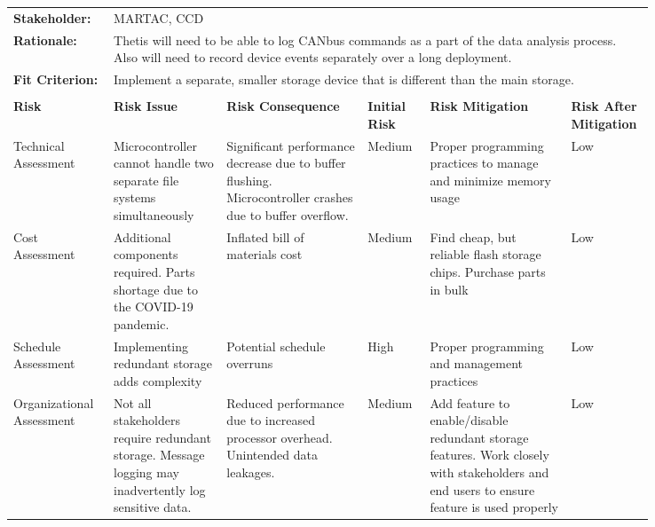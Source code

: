 \begin{landscape}
{\begin{longtable}{| p{0.12\linewidth} | p{0.16\linewidth} |  p{0.20\linewidth} | p{0.08\linewidth} | p{0.20\linewidth} | p{0.08\linewidth} |}
	\hline
	\rowcolor[gray]{0.8}
	\multicolumn{6}{|c|}{ } \\
	\hline
	\textbf{Stakeholder:} & \multicolumn{5}{|l|}{MARTAC, CCD} \\
	\hline
	\textbf{Rationale:} & \multicolumn{5}{|p{0.8\linewidth}|}{Thetis will need to be able to log CANbus commands as a part of the data analysis process. Also will need to record device events separately over a long deployment.} \\
	\hline
	\textbf{Fit Criterion:} & \multicolumn{5}{|p{0.8\linewidth}|}{Implement a separate, smaller storage device that is different than the main storage.} \\
	\hline
	\rowcolor[gray]{0.8}
	\multicolumn{6}{|c|}{ } \\
	\hline
	\textbf{Risk} & \textbf{Risk Issue} & \textbf{Risk Consequence} & \textbf{Initial Risk} & \textbf{Risk Mitigation} & \textbf{Risk \newline After \newline Mitigation} \\
	\hline
	Technical \newline Assessment & Microcontroller cannot handle two separate file systems simultaneously & Significant performance decrease due to buffer flushing. \newline Microcontroller crashes due to buffer overflow. & \cellcolor{yellow} Medium & Proper programming practices to manage and minimize memory usage & \cellcolor{green} Low \\
	\hline
	Cost \newline Assessment & Additional components required. \newline Parts shortage due to the COVID-19 pandemic. & Inflated bill of materials cost & \cellcolor{yellow} Medium & Find cheap, but reliable flash storage chips. \newline Purchase parts in bulk & \cellcolor{green} Low \\
	\hline
	Schedule \newline Assessment & Implementing redundant storage adds complexity & Potential schedule overruns & \cellcolor{red} High & Proper programming and management practices & \cellcolor{green} Low \\
	\hline
	Organizational \newline Assessment & Not all stakeholders require redundant storage. \newline Message logging may inadvertently log sensitive data. & Reduced performance due to increased processor overhead. \newline Unintended data leakages. & \cellcolor{yellow} Medium & Add feature to enable/disable redundant storage features. \newline Work closely with stakeholders and end users to ensure feature is used properly & \cellcolor{green} Low \\

\end{longtable}}
\end{landscape}
